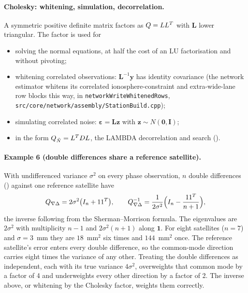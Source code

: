 \documentclass[main.tex]{subfiles}
\begin{document}
\paragraph{Cholesky: whitening, simulation, decorrelation.}
A symmetric positive definite matrix factors as $Q = LL^{T}$
with $\bm{L}$ lower triangular.  The factor is used for
\begin{itemize}[leftmargin=*, itemsep=1pt]
\item solving the normal equations, at half the cost of an LU factorisation
      and without pivoting;
\item whitening correlated observations: $\bm{L}^{-1}\bm{y}$ has identity
      covariance (the network estimator whitens its correlated
      ionosphere-constraint and extra-wide-lane row blocks this way, in
      \texttt{networkWriteWhitenedRows},
      \texttt{src/core/network/assembly/StationBuild.cpp});
\item simulating correlated noise: $\bm{\varepsilon} = \bm{L}\bm{z}$ with
      $\bm{z}\sim N(\bm{0},\bm{I})$;
\item in the form $Q_{\hat N} = L^{T}DL$, the LAMBDA decorrelation
      and search ().
\end{itemize}

\paragraph{Example 6 (double differences share a reference satellite).}
\label{la:ex6}%
With undifferenced variance $\sigma^2$ on every phase observation, $n$
double differences () against one reference satellite have
\begin{equation}
Q_{\nabla\Delta} = 2\sigma^2\bigl(I_n + 11^{T}\bigr),
\qquad
Q_{\nabla\Delta}^{-1} = \frac{1}{2\sigma^2}
  \Bigl(I_n - \frac{11^{T}}{n+1}\Bigr),
\label{eq:la-ddcov}
\end{equation}
the inverse following from the Sherman--Morrison formula.  The eigenvalues
are $2\sigma^2$ with multiplicity $n-1$ and $2\sigma^2(n+1)$ along
$\bm{1}$.  For eight satellites ($n = 7$) and $\sigma = 3$~mm they are
$18$~mm$^2$ six times and $144$~mm$^2$ once.  The reference satellite's
error enters every double difference, so the common-mode direction carries
eight times the variance of any other.  Treating the double differences as
independent, each with its true variance $4\sigma^2$, overweights that
common mode by a factor of 4 and underweights every other direction by a
factor of 2.  The inverse above, or whitening by the Cholesky factor,
weights them correctly.
\end{document}
